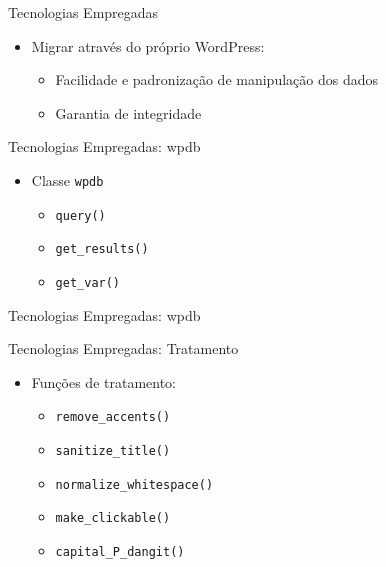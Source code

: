\documentclass[handout]{beamer}
\begin{document}
\begin{frame}{Tecnologias Empregadas}
  \begin{itemize}
    \pause \item Migrar através do próprio WordPress:
    \begin{itemize}
      \pause \item Facilidade e padronização de manipulação dos dados
      \pause \item Garantia de integridade
    \end{itemize}
  \end{itemize}
\end{frame}

\begin{frame}{Tecnologias Empregadas: wpdb}
  \begin{itemize}
    \pause \item Classe \texttt{wpdb}
    \begin{itemize}
      \pause \item \texttt{query()}
      \pause \item \texttt{get\_results()}
      \pause \item \texttt{get\_var()}
    \end{itemize}
  \end{itemize}
\end{frame}

\begin{frame}{Tecnologias Empregadas: wpdb}
  
\end{frame}

\begin{frame}{Tecnologias Empregadas: Tratamento}
  \begin{itemize}
    \pause \item Funções de tratamento:
    \begin{itemize}
      \pause \item \texttt{remove\_accents()}
      \pause \item \texttt{sanitize\_title()}
      \pause \item \texttt{normalize\_whitespace()}
      \pause \item \texttt{make\_clickable()}
      \pause \item \texttt{capital\_P\_dangit()}
    \end{itemize}
  \end{itemize}
\end{frame}
\end{document}
